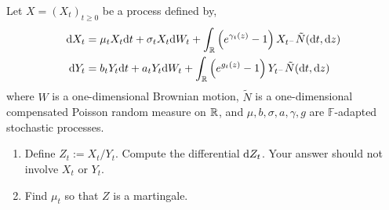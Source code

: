 \begin{problem}[Exercise 10.3]
    Let \( X = (X_t)_{t\geq 0} \) be a process defined by,
    \begin{align*}
        \mathrm{d} X_t &= \mu_t X_t \mathrm{d} t + \sigma_t X_t \mathrm{d} W_t + \int_{\mathbb{R}} \left( e^{\gamma_t(z)}-1 \right)X_{t^-} \tilde{N}(\mathrm{d} t, \mathrm{d} z) \\
        \mathrm{d} Y_t &= b_t Y_t \mathrm{d} t + a_t Y_t \mathrm{d} W_t + \int_{\mathbb{R}} \left( e^{g_t(z)}-1 \right)Y_{t^-}\tilde{N}(\mathrm{d} t,\mathrm{d} z)
    \end{align*} 
    where \( W \) is a one-dimensional Brownian motion, \( \tilde{N} \) is a one-dimensional compensated Poisson random measure on \( \mathbb{R} \), and \( \mu,b,\sigma,a,\gamma, g\) are \( \mathbb{F} \)-adapted stochastic processes.
    \begin{enumerate}[label=(\alph*)]
        \item Define \( Z_t:=X_t/Y_t \). Compute the differential \( \mathrm{d} Z_t \). Your answer should not involve \( X_t \) or \( Y_t \).
        \item Find \( \mu_t \) so that \( Z \) is a martingale.
    \end{enumerate}
\end{problem}


